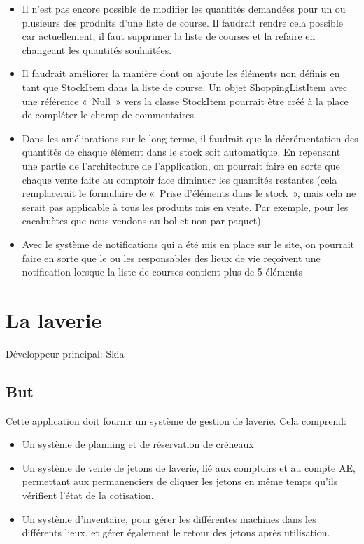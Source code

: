 \documentclass[a4paper]{report}
\begin{document}
\begin{itemize}
    \item Il n’est pas encore possible de modifier les quantités demandées pour un ou plusieurs des produits d’une liste
        de course. Il faudrait rendre cela possible car actuellement, il faut supprimer la liste de courses et la
        refaire en changeant les quantités souhaitées.
    \item Il faudrait améliorer la manière dont on ajoute les éléments non définis en tant que StockItem dans la liste
        de course. Un objet ShoppingListItem avec une référence « Null » vers la classe StockItem pourrait être créé à
        la place de compléter le champ de commentaires.
    \item Dans les améliorations sur le long terme, il faudrait que la décrémentation des quantités de chaque élément
        dans le stock soit automatique. En repensant une partie de l’architecture de l’application, on pourrait faire en
        sorte que chaque vente faite au comptoir face diminuer les quantités restantes (cela remplacerait le formulaire
        de « Prise d’éléments dans le stock », mais cela ne serait pas applicable à tous les produits mis en vente. Par
        exemple, pour les cacahuètes que nous vendons au bol et non par paquet)
    \item Avec le système de notifications qui a été mis en place sur le site, on pourrait faire en sorte que le ou les
        responsables des lieux de vie reçoivent une notification lorsque la liste de courses contient plus de 5 éléments
\end{itemize}


\chapter{La laverie}
\label{sec:la_laverie}
\par Développeur principal: Skia

\section{But}
\label{sub:but}
\par Cette application doit fournir un système de gestion de laverie. Cela comprend:
\begin{itemize}
    \item Un système de planning et de réservation de créneaux
    \item Un système de vente de jetons de laverie, lié aux comptoirs et au compte AE, permettant aux permanenciers de
        cliquer les jetons en même temps qu'ils vérifient l'état de la cotisation.
    \item Un système d'inventaire, pour gérer les différentes machines dans les différents lieux, et gérer également le
        retour des jetons après utilisation.
\end{itemize}
\end{document}
